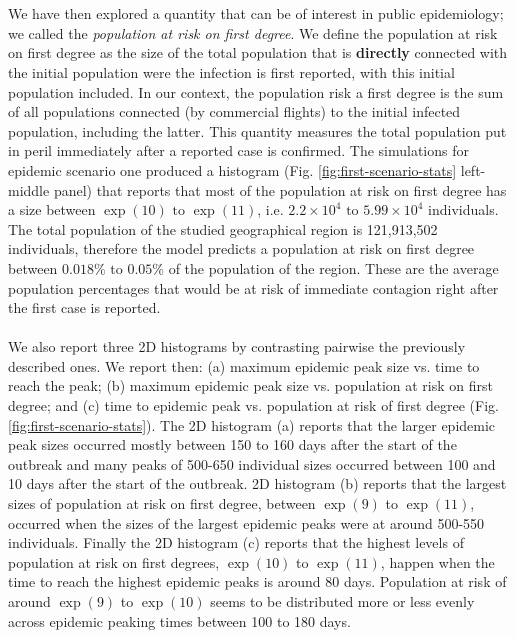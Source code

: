 \documentclass[10pt,a4paper]{article}
\begin{document}
\\\\
We have then explored a quantity that can be of interest in public epidemiology; we called the \textit{population at risk on first degree}. We define the population at risk on first degree as the size of the total population that is \textbf{directly} connected with the initial population were the infection is first reported, with this initial population included. In our context, the population risk a first degree is the sum of all populations connected (by commercial flights) to the initial infected population, including the latter. This quantity measures the total population put in peril immediately after a reported case is confirmed. The simulations for epidemic scenario one produced a histogram (Fig. \ref{fig:first-scenario-stats} left-middle panel) that reports that most of the population at risk on first degree has a size  between $\exp(10) \text{ to }\exp(11)$, i.e. $2.2\times 10^4 \text{ to } 5.99\times 10^4$ individuals. The total population of the studied geographical region is 121,913,502 individuals, therefore the model predicts a population at risk on first degree between $0.018\% \text{ to } 0.05\%$ of the population of the region. These are the average population percentages that would be at risk of immediate contagion right after the first case is reported.
\\\\
We also report three 2D histograms by contrasting pairwise the previously described ones. We report then: (a) maximum epidemic peak size vs. time to reach the peak; (b) maximum epidemic peak size vs. population at risk on first degree; and (c) time to epidemic peak vs. population at risk of first degree (Fig. \ref{fig:first-scenario-stats}). The 2D histogram (a) reports that the larger epidemic peak sizes occurred mostly between 150 to 160 days after the start of the outbreak and many peaks of 500-650 individual sizes occurred between 100 and 10 days after the start of the outbreak. 2D histogram (b) reports that the largest sizes of population at risk on first degree, between $\exp(9)$ to $\exp(11)$, occurred when the sizes of the largest epidemic peaks were at around 500-550 individuals. Finally the 2D histogram (c) reports that the highest levels of population at risk on first degrees, $\exp(10)$ to $\exp(11)$, happen when the time to reach the highest epidemic peaks is around 80 days. Population at risk of around $\exp(9)$ to $\exp(10)$ seems to be distributed more or less evenly across epidemic peaking times between 100 to 180 days. 
\end{document}
